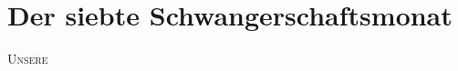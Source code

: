 

\chapter*{Der siebte Schwangerschaftsmonat} 

\lettrine[lines=2, loversize=0.3, lraise=0]{\initfamily U}{nsere}
